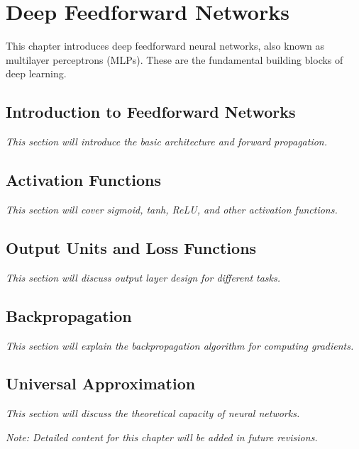 
\chapter{Deep Feedforward Networks}
\label{chap:feedforward-networks}

This chapter introduces deep feedforward neural networks, also known as multilayer perceptrons (MLPs). These are the fundamental building blocks of deep learning.

\section{Introduction to Feedforward Networks}

\textit{This section will introduce the basic architecture and forward propagation.}

\section{Activation Functions}

\textit{This section will cover sigmoid, tanh, ReLU, and other activation functions.}

\section{Output Units and Loss Functions}

\textit{This section will discuss output layer design for different tasks.}

\section{Backpropagation}

\textit{This section will explain the backpropagation algorithm for computing gradients.}

\section{Universal Approximation}

\textit{This section will discuss the theoretical capacity of neural networks.}

\vspace{1em}
\noindent\textit{Note: Detailed content for this chapter will be added in future revisions.}
